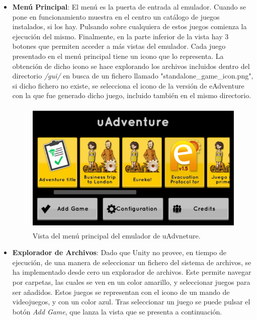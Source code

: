\begin{itemize}
	\item \textbf{Menú Principal}: El menú es la puerta de entrada al emulador. Cuando se pone en funcionamiento muestra en el centro un catálogo de juegos instalados, si los hay. Pulsando sobre cualquiera de estos juegos comienza la ejecución del mismo. Finalmente, en la parte inferior de la vista hay 3 botones que permiten acceder a más vistas del emulador. Cada juego presentado en el menú principal tiene un icono que lo representa. La obtención de dicho icono se hace explorando los archivos incluidos dentro del directorio \textit{/gui/} en busca de un fichero llamado "standalone\_game\_icon.png", si dicho fichero no existe, se selecciona el icono de la versión de eAdventure con la que fue generado dicho juego, incluido también en el mismo directorio.

\begin{figure}[h!]
	\centerline{\includegraphics[height=2.5in]{figures/it3/emu-main.png}}
	\caption[Menu Principal - Emulador]{Vista del menú principal del emulador de uAdvneture.}
	\label{emumainit3}
\end{figure}


	\item \textbf{Explorador de Archivos}: Dado que Unity no provee, en tiempo de ejecución, de una manera de seleccionar un fichero del sistema de archivos, se ha implementado desde cero un explorador de archivos. Este permite navegar por carpetas, las cuales se ven en un color amarillo, y seleccionar juegos para ser añadidos. Estos juegos se representan con el icono de un mando de videojuegos, y con un color azul. Tras seleccionar un juego se puede pulsar el botón \textit{Add Game}, que lanza la vista que se presenta a continuación.


\end{itemize}
